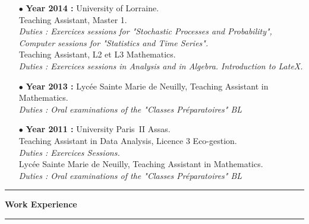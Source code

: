 \documentclass[a4paper,11pt]{article}
\newcommand{\titre}[1]{%
	\begin{center}
	\bigskip
	\rule{\textwidth}{1pt}
	\par\vspace{0.1cm}
        \textbf{\large #1}
	\par\rule{\textwidth}{1pt}
	\end{center}
	\bigskip
	}
\begin{document}
\begin{itemize}
\item[$\bullet$] \textbf{ Year 2014 :}  University of Lorraine.\\
					Teaching Assistant, Master 1. \\
					\textit{Duties : Exercices sessions for "Stochastic Processes and Probability", Computer sessions for "Statistics and Time Series".}\\
					Teaching Assistant, L2 et L3 Mathematics. \\
					\textit{Duties : Exercices sessions in Analysis and in Algebra. Introduction to LateX.}\\
\item[$\bullet$] \textbf{ Year 2013 :} Lycée Sainte Marie de Neuilly, Teaching Assistant in Mathematics. \\
					\textit{Duties : Oral examinations of the "Classes Préparatoires" BL} \\
\item[$\bullet$] \textbf{ Year 2011 :} University Paris~II Assas.\\
					Teaching Assistant in Data Analysis, Licence 3 Eco-gestion.\\
					\textit{Duties : Exercices Sessions.}\\
					Lycée Sainte Marie de Neuilly, Teaching Assistant in Mathematics. \\
					\textit{Duties : Oral examinations of the "Classes Préparatoires" BL} 
\end{itemize}

\newpage
\titre{Work Experience}
\end{document}
